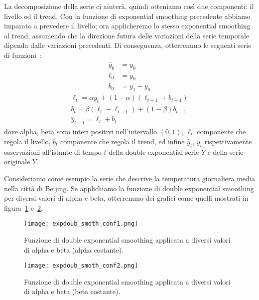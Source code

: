 La decomposizione della serie ci aiuterà, quindi otteniamo così due componenti: il livello
ed il trend. Con la funzione di exponential smoothing precedente abbiamo imparato a 
prevedere il livello; ora applicheremo lo stesso exponential smoothing al trend, assumendo
che la direzione futura delle variazioni della serie temporale dipenda dalle variazioni precedenti.
Di conseguenza, otterremmo le seguenti serie di funzioni~\cite{mlc:tim_ser_an}:
\begin{align*}
    \hat{y}_0 & = y_0 \\
    \ell_0 & = y_0 \quad \\
    b_0    & = y_1 - y_0
\end{align*}
\begin{gather*}
    \ell_t = \alpha y_t + (1 - \alpha) (\ell_{t-1} + b_{t-1})\\
    b_t    = \beta(\ell_t - \ell_{t-1}) + (1 - \beta)b_{t-1} \\
    \hat{y}_{t+1} = \ell_t + b_t
\end{gather*}
dove alpha, beta sono interi positivi nell'intervallo $(0, 1)$, 
$\ell_t$ componente che regola il livello,
$b_t$ componente che regola il trend, ed infine
$\hat{y}_t$, $y_t$ rispettivamente osservazioni all'istante di tempo $t$ della double
exponential serie $\hat{Y}$ e della serie originale $Y$.

\begin{esempio}
    Consideriamo come esempio la serie che descrive la temperatura giornaliera media
    nella città di Beijing. Se applichiamo la funzione di double exponential smoothing per diversi
    valori di alpha e beta, otterremmo dei grafici come quelli mostrati 
    in figura~\ref{fig:expdoub_smoot1} e~\ref{fig:expdoub_smoot2}.
    
    \begin{figure}[H]
        \centering
        \texttt{[image: expdoub\_smoth\_conf1.png]}
        \caption{Funzione di double exponential smoothing applicata a diversi valori di alpha e beta (alpha costante).}
        \label{fig:expdoub_smoot1}
    \end{figure}

    \begin{figure}[H]
        \centering
        \texttt{[image: expdoub\_smoth\_conf2.png]}
        \caption{Funzione di double exponential smoothing applicata a diversi valori di alpha e beta (beta costante).}
        \label{fig:expdoub_smoot2}
    \end{figure}

\end{esempio}